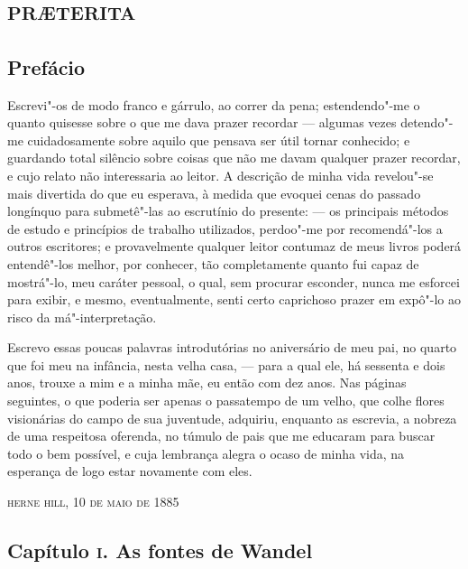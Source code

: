 
\part{\textsc{pr\ae terita}}


\chapter{Prefácio}


Escrevi"-os de modo franco e gárrulo, ao correr da pena; estendendo"-me o
quanto quisesse sobre o que me dava prazer recordar --- algumas vezes
detendo"-me cuidadosamente sobre aquilo que pensava ser útil tornar
conhecido; e guardando total silêncio sobre coisas que não me davam
qualquer prazer recordar, e cujo relato não interessaria ao leitor. A
descrição de minha vida revelou"-se mais divertida do que eu esperava, à
medida que evoquei cenas do passado longínquo para submetê"-las ao
escrutínio do presente: --- os principais métodos de estudo e princípios
de trabalho utilizados, perdoo"-me por recomendá"-los a outros escritores;
e provavelmente qualquer leitor contumaz de meus livros poderá
entendê"-los melhor, por conhecer, tão completamente quanto fui capaz de
mostrá"-lo, meu caráter pessoal, o qual, sem procurar esconder, nunca me
esforcei para exibir, e mesmo, eventualmente, senti certo caprichoso
prazer em expô"-lo ao risco da má"-interpretação.

Escrevo essas poucas palavras introdutórias no aniversário de meu pai,
no quarto que foi meu na infância, nesta velha casa, --- para a qual ele,
há sessenta e dois anos, trouxe a mim e a minha mãe, eu então com dez
anos. Nas páginas seguintes, o que poderia ser apenas o passatempo de um
velho, que colhe flores visionárias do campo de sua juventude, adquiriu,
enquanto as escrevia, a nobreza de uma respeitosa oferenda, no túmulo de
pais que me educaram para buscar todo o bem possível, e cuja lembrança
alegra o ocaso de minha vida, na esperança de logo estar novamente com
eles. \EP[1]


\hfill\textsc{herne hill, 10 de maio de 1885}

\chapter{Capítulo \textsc{i}. As fontes de Wandel}


